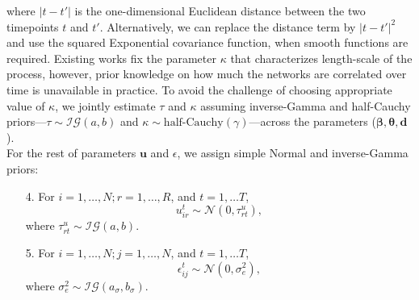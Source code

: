 \documentclass[a4paper]{article}
\begin{document}
where $|t-t'|$ is the one-dimensional Euclidean distance between the two timepoints $t$ and $t'$. Alternatively, we can replace the distance term by $|t-t'|^2$ and use the squared Exponential covariance function, when smooth functions are required. Existing works \citep{bhattacharya2011sparse,durante2013nonparametric} fix the parameter $\kappa$ that characterizes length-scale of the process, however, prior knowledge on how much the networks are correlated over time is unavailable in practice. To avoid the challenge of choosing appropriate value of $\kappa$, we jointly estimate $\tau$ and $\kappa$ assuming inverse-Gamma and half-Cauchy priors---$\tau\sim \mathcal{IG}(a, b)$ and $\kappa \sim \mbox{half-Cauchy}(\gamma)$---across the parameters ($\boldsymbol{\beta}, \boldsymbol{\theta}, \boldsymbol{d}$). \\\newline
For the rest of parameters $\boldsymbol{u}$ and $\epsilon$, we assign simple Normal and inverse-Gamma priors:
\begin{itemize}
	\item[4.] For $i = 1,\ldots,N; r=1,\ldots,R$, and $t=1,\ldots T$, 
	\begin{equation*}
u^t_{ir}\sim\mathcal{N}(0, {\tau}^u_{rt}),
	\end{equation*}
	where ${\tau}^u_{rt}\sim \mathcal{IG}(a, b)$.
	\item[5.] For $i = 1,\ldots,N; j=1,\ldots,N$, and $t=1,\ldots T$, 
	\begin{equation*}	
	\epsilon^t_{ij} \sim \mathcal{N}(0, \sigma_e^2),
		\end{equation*}
		 where $\sigma_e^2 \sim \mathcal{IG}(a_\sigma, b_\sigma)$. 
\end{itemize}
\end{document}

